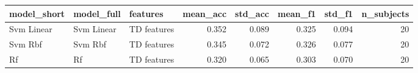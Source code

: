 \begin{tabular}{lllrrrrr}
\toprule
model_short & model_full & features & mean_acc & std_acc & mean_f1 & std_f1 & n_subjects \\
\midrule
Svm Linear & Svm Linear & TD features & 0.352 & 0.089 & 0.325 & 0.094 & 20 \\
Svm Rbf & Svm Rbf & TD features & 0.345 & 0.072 & 0.326 & 0.077 & 20 \\
Rf & Rf & TD features & 0.320 & 0.065 & 0.303 & 0.070 & 20 \\
\bottomrule
\end{tabular}
